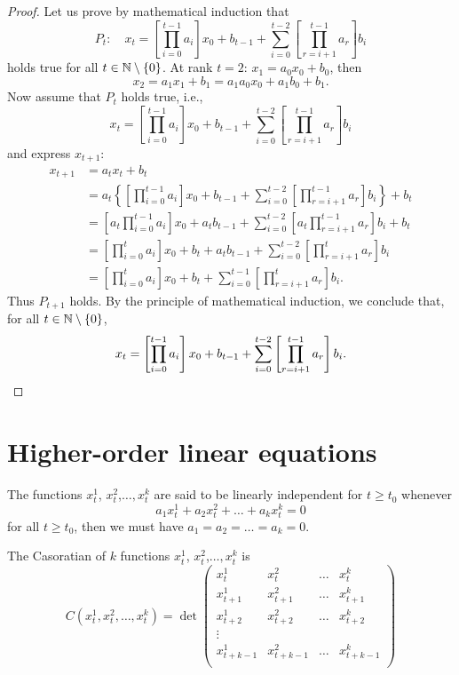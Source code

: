 \begin{proof}
Let us prove by mathematical induction that
\[
P_t:\quad
x_t=\left [\prod_{i=0}^{t-1} a_i\right ]x_0 +b_{t-1}+\sum_{i=0}^{t-2}\left [ \prod_{r=i+1}^{t-1} a_r \right]b_i
\]
holds true for all $t\in \mathbb{N}\setminus\{0\}$.
At rank $t=2$: $x_1=a_0x_0+b_0$, then
$$x_2=a_1x_1+b_1=a_1a_0x_0+a_1b_0+b_1.$$
Now assume that $P_t$ holds true, i.e., 
$$x_t=\left [\prod_{i=0}^{t-1} a_i\right ]x_0 +b_{t-1}+\sum_{i=0}^{t-2}\left [ \prod_{r=i+1}^{t-1} a_r \right]b_i$$
and express $x_{t+1}$:
\begin{align*}
x_{t+1} &= a_tx_t+b_t \\
&=a_t\left\{\left[\prod_{i=0}^{t-1} a_i\right]x_0 +b_{t-1}
+\sum_{i=0}^{t-2}\left[\prod_{r=i+1}^{t-1} a_r \right]b_i \right\}+b_t \\
&=\left[a_t\prod_{i=0}^{t-1} a_i\right ]x_0+a_tb_{t-1}+\sum_{i=0}^{t-2}\left [ a_t\prod_{r=i+1}^{t-1} a_r \right]b_i+b_t \\
&=\left [\prod_{i=0}^{t} a_i\right ]x_0+b_t+a_tb_{t-1}+\sum_{i=0}^{t-2}\left [ \prod_{r=i+1}^{t} a_r \right]b_i \\
&= \left [\prod_{i=0}^{t} a_i\right ]x_0+b_t
+\sum_{i=0}^{t-1}\left [ \prod_{r=i+1}^{t} a_r \right]b_i.
\end{align*}
Thus $P_{t+1}$ holds.
By the principle of mathematical induction, we conclude that, for all $t\in\mathbb{N}\setminus\{0\}$, 
$$x_t=\left [\prod_{i=0}^{t-1} a_i\right ]x_0 +b_{t-1}+\sum_{i=0}^{t-2}\left [ \prod_{r=i+1}^{t-1} a_r \right]b_i.\qedhere$$
\end{proof}

\section{Higher-order linear equations}
\begin{definition}
The functions $x_t^1$, $x_t^2$,$\dots, x_t^k$ are said to be linearly independent for $t\geq t_0$ whenever 
$$a_1x^1_t+a_2x^2_t+\dots + a_kx^k_t=0$$
for all $t\geq t_0$, then we must have $a_1=a_2= \dots =a_k=0$.
\end{definition}

\begin{definition}
The Casoratian of $k$ functions $x_t^1$, $x_t^2$,$\dots, x_t^k$ is
$$C(x_t^1, x_t^2,\dots, x_t^k)=\det \left (
\begin{array}{cccc}
x_t^1 & x_t^2 & \dots & x_t^k\\
x_{t+1}^1 & x_{t+1}^2 & \dots & x_{t+1}^k\\
x_{t+2}^1 & x_{t+2}^2 & \dots & x_{t+2}^k\\
\vdots & & &\\
x_{t+k-1}^1 & x_{t+k-1}^2 & \dots & x_{t+k-1}^k\\
\end{array}\right )$$
\end{definition}


